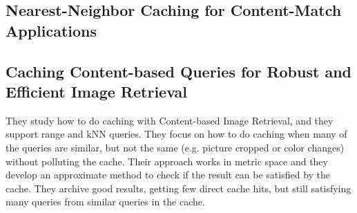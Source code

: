 



\subsection{Nearest-Neighbor Caching for Content-Match Applications}

\cite{nnccma}



\subsection{Caching Content-based Queries for Robust and Efficient Image Retrieval}

They study how to do caching with Content-based Image Retrieval, and they support range and kNN queries. They focus on how to do caching when many of the queries are similar, but not the same (e.g. picture cropped or color changes) without polluting the cache. Their approach works in metric space and they develop an approximate method to check if the result can be satisfied by the cache. They archive good results, getting few direct cache hits, but still satisfying many queries from similar queries in the cache.

\cite{ccqreir}




